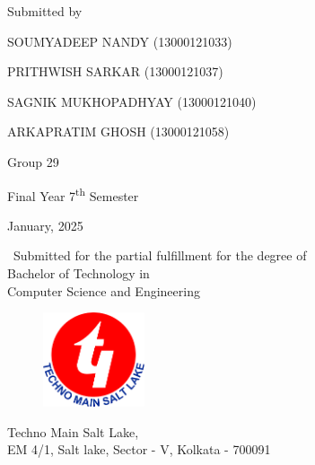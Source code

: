 \thispagestyle{empty}
\begin{center}
    { \Large {\bfseries {\mytitle}} \par}
\vspace{2\baselineskip}
    {
    \large{Submitted by} 
    
    \vspace{2\baselineskip}

\vspace{\baselineskip}

    {SOUMYADEEP NANDY (13000121033)}
    
    \vspace{\baselineskip}

   {PRITHWISH SARKAR (13000121037)}
  \vspace{\baselineskip}

     {SAGNIK MUKHOPADHYAY (13000121040)}
    \vspace{\baselineskip}

    {ARKAPRATIM GHOSH (13000121058)}

\vspace{1\baselineskip}
\vspace{1\baselineskip}
    \large{Group 29}}
    
 \vspace{1\baselineskip}   
    \large{Final Year 7\textsuperscript{th} Semester \par}   
\vspace{\baselineskip}
    \large{January, 2025}
    
\vspace{\baselineskip}
    {\ {Submitted for the partial fulfillment for the degree of \\Bachelor of Technology in \\Computer Science and Engineering }\par}
\vspace{1\baselineskip}
    {\begin{figure}[!h] 
	\centering
	\includegraphics[width=30mm]{./Images/tmsl.png} 
     \end{figure}
    }
\vspace{1.5\baselineskip}

    { {Techno Main Salt Lake,\\
                    EM 4/1, Salt lake, Sector - V, Kolkata - 700091} \par}
 \end{center}
